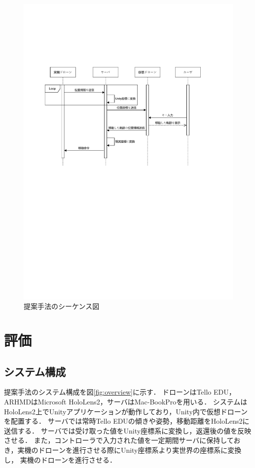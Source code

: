 \documentclass[a4paper,10pt,twocolumn,uplatex]{jsarticle}
\begin{document}
\begin{figure}[!tb]
  \centering
  \includegraphics[width=\linewidth]{img/sequence.pdf}
  \caption{提案手法のシーケンス図}
  \label{fig:sequence}
\end{figure}


\section{評価}\label{experiment}
\subsection{システム構成}
提案手法のシステム構成を図\ref{fig:overview}に示す．
ドローンはTello EDU，ARHMDはMicrosoft HoloLens2，サーバはMac-BookProを用いる．
システムはHoloLens2上でUnityアプリケーションが動作しており，Unity内で仮想ドローンを配置する．
サーバでは常時Tello EDUの傾きや姿勢，移動距離をHoloLens2に送信する．
サーバでは受け取った値をUnity座標系に変換し，返還後の値を反映させる．
また，コントローラで入力された値を一定期間サーバに保持しておき，実機のドローンを進行させる際にUnity座標系より実世界の座標系に変換し，
実機のドローンを進行させる．
\end{document}
